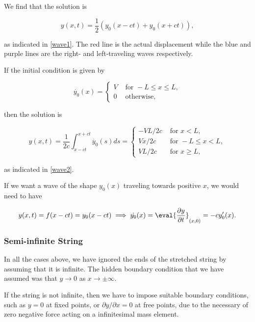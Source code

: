 \documentclass[a4paper,12pt]{report}
\begin{document}
We find that the solution is 

\begin{equation}
	y(x,t) = \frac{1}{2}(y_0 (x-ct)+y_0 (x+ct)), 
\end{equation}

as indicated in \cref{wave1}. The red line is the actual displacement while the blue and purple lines are the right- and left-traveling waves respectively.


If the initial condition is given by 

\begin{equation}
	\dot{y_0 }(x) = \begin{cases}
		V &\text{ for } -L \le x \le L,\\
		0 &\text{ otherwise} ,
	\end{cases}
\end{equation}

then the solution is 

\begin{equation}
	y(x,t) = \frac{1}{2c} \int_{x-ct}^{x+ct} \dot{y_0 }(s)ds = \begin{cases}
		 -VL/2c  &\text{ for } x<L,\\
		 Vx/2c  &\text{ for } -L \le x <L,\\
		 VL/2c &\text{ for } x \ge L,
	\end{cases} 
\end{equation}

as indicated in \cref{wave2}. 


If we want a wave of the shape \(y_0 (x)\) traveling towards positive \(x\), we would need to have 

\begin{equation}
	y(x,t) = f(x-ct) = y_0 (x-ct) \implies \dot{y_0 }(x) = \eval{\frac{\partial y}{\partial t} }_{(x,0)}^{} = -cy_0 '(x).  
\end{equation}

\subsubsection{Semi-infinite String}

In all the cases above, we have ignored the ends of the stretched string by assuming that it is infinite. The hidden boundary condition that we have assumed was that \(y \to 0\) as \(x \to \pm \infty\).

If the string is not infinite, then we have to impose suitable boundary conditions, such as \(y=0\) at fixed points, or \( \partial y/\partial x = 0\) at free points, due to the necessary of zero negative force acting on a infinitesimal mass element.  
\end{document}
